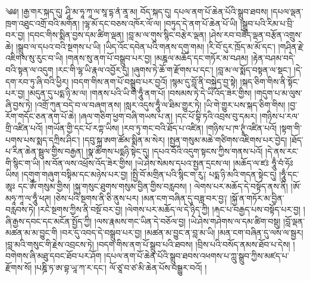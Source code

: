 \setcounter{footnote}{0} 
༄༅། །རྒྱ་གར་སྐད་དུ། ཤཱི་མ་ཧཱ་ཀཱ་ལ་སཱ་དྷ་ནཾ་ནཱ་མ། བོད་སྐད་དུ། དཔལ་ནག་པོ་ཆེན་པོའི་སྒྲུབ་ཐབས། །དཔལ་ལྡན་ཁྲག་འཐུང་འགྲོ་བའི་མགོན། །ལྷ་མོ་དང་བཅས་འཁོར་ལོ་ལ། །བཏུད་དེ་ནག་པོ་ཆེན་པོ་ཡི། །སྒྲུབ་པའི་རིམ་པ་བྲི་བར་བྱ། །དབང་གིས་སྨིན་བྱས་དམ་ཚིག་ལྡན། །བླ་མ་ལ་གུས་སྙིང་བརྩེར་ལྡན། །ཤེས་རབ་བཟོད་ལྡན་བརྩོན་འགྲུས་ཆེ། །སྒྲུབ་ལ་དཔའ་བའི་སྔགས་པ་ཡི། །ཡིད་འོང་དབེན་པའི་གནས་དགུ་གམ། །རི་བོ་དུར་ཁྲོད་མ་མོ་དང་། །གཤིན་རྗེ་འཇིགས་སུ་རུང་བ་ཡི། །གནས་སུ་ནག་པོ་བསྒྲུབ་པར་བྱ། །མཎྜལ་མཆོད་དང་གཏོར་མ་བཤམ། །རྟེན་བཤམ་བདེ་བའི་སྟན་ལ་འདུག །རང་གི་ལྷ་ཡི་རྣལ་འབྱོར་དུ། །ཞུགས་ཏེ་ཆོ་ག་རྫོགས་པ་དང་། །བླ་མ་ལ་སྨོད་བསྟན་ལ་སྡང་། །དེ་དག་རབ་ཏུ་ཞི་བའི་ཕྱིར། །བདག་གིས་ནག་པོ་བསྒྲུབ་པར་བྱའོ། །སྙམ་དུ་བློ་ནི་བསྐྱེད་བྱ་སྟེ། །སྐད་ཅིག་གིས་ནི་སྟོང་པར་བྱ། །མདུན་དུ་པདྨ་ཉི་མ་ལ། །གནས་པའི་ཡི་གེ་ཧཱུྃ་ནག་པོ། །བསམས་ཏེ་དེ་ཡི་འོད་ཟེར་གྱིས། །གདུག་པ་མ་ལུས་ཞི་བྱས་ཏེ། །འགྲོ་ཀུན་བདེ་བ་ལ་བཞག་ནས། །སླར་འདུས་ཧཱུྃ་ལ་ཐིམ་གྱུར་ཏེ། །ཡི་གེ་གྱུར་པས་སྐད་ཅིག་གིས། །བྱ་རོག་གདོང་ཅན་ནག་པོ་ཆེ། །ཞལ་གཅིག་ཕྱག་བཞི་གཡས་པ་ན། །དང་པོ་བྷི་ཏའི་འབྲས་བུ་དམར། །གཉིས་པ་རལ་གྲི་འཛིན་པའོ། །གཡོན་གྱི་དང་པོ་རཀྟ་ཡིས། །རབ་ཏུ་གང་བའི་ཐོད་པ་འཛིན། །གཉིས་པ་ཁ་ཊྭཱཾ་འཛིན་པའོ། །སྟག་གི་པགས་པས་སྨད་དཀྲིས་ཤིང་། །དབུ་སྐྲ་ཨག་ཚོམ་སྨིན་མ་སེར། །སྤྱན་གསུམ་མཆེ་གཙིགས་འཇིགས་པར་བྱེད། །ཐོད་པ་རིན་ཆེན་སྦྲུལ་གྱིས་བརྒྱན། །སྣ་ཚོགས་པདྨཉི་སྟེང་དུ། །དཔའ་བོའི་འདུག་སྟངས་ཀྱིས་གནས་པའོ། །དེ་ནས་རང་གི་སྙིང་ག་ཡི། །ས་བོན་ལས་འཕྲོས་འོད་ཟེར་གྱིས། །ཡེ་ཤེས་སེམས་དཔའ་སྤྱན་དྲངས་ལ། །མཆོད་ལ་ཛཿ ཧཱུྃ་བཾ་ཧོཿ ཡིས། །དགུག་གཞུག་བསྟིམ་དང་མཉེས་པར་བྱ། །སྤྱི་བོ་མགྲིན་པའི་སྙིང་ག་རུ༑ པདྨ་ཉི་མའི་གདན་སྟེང་དུ། །ཧཱུྃ་དང་ཨཱཿ དང་ཨོཾ་གསུམ་གྱིས། །སྐུ་གསུང་ཐུགས་གསུམ་བྱིན་གྱིས་བརླབས། །
ལེགས་པར་མཆོད་དེ་བསྟོད་ནས་ནི། །ཨོ་མཧཱ་ཀཱ་ལ་ཧཱུྃ་ཕཊ྄། །ཅེས་པའི་སྔགས་ནི་ཅི་ནུས་པར། །མན་ངག་བཞིན་དུ་བཟླ་བར་བྱ༑ །སྐྱོ་ན་གཏོར་མ་བྱིན་བརླབས་ཏེ། །རང་སྔགས་ཀྱིས་ནི་བསྔོ་བར་བྱ། །ལེགས་པར་མཆོད་ལ་དེ་ཉིད་ཀྱི། །རྐང་པ་བརྒྱད་པས་བསྟོད་པར་བྱ། །ཞི་རྒྱས་དབང་དང་མངོན་སྤྱོད་ཀྱི། །ལས་རྣམས་གང་ཡིན་དེ་བཅོལ་བྱ། །ཡེ་ཤེས་གཤེགས་ལ་དམ་ཚིག་བསྡུ། །བློ་ལྡན་མཚན་མ་མ་བྱུང་གི །བར་དུ་འབད་དེ་བསྒྲུབ་པར་བྱ། །མཚན་མ་བྱུང་ན་བླ་མ་ཡི། །མན་ངག་བཞིན་དུ་ལས་ལ་སྦྱར། །བླ་མའི་གསུང་གི་རྗེས་འབྲངས་ཏེ། །བདག་གིས་ནག་པོ་སྒྲུབ་པའི་ཐབས། །བྲིས་པའི་བསོད་ནམས་ཐོབ་པ་དེས། །བགེགས་ཞི་མཐུ་དབང་ཐོབ་པར་ཤོག །དཔལ་ནག་པོ་ཆེན་པོའི་སྒྲུབ་ཐབས་འཕགས་པ་ཀླུ་སྒྲུབ་ཀྱིས་མཛད་པ་རྫོགས་སོ། །པཎྜི་ཏ་ཨ་བྷ་ཡཱ་ཀ་ར་དང་། ལོ་ཙཱ་བ་ཙ་མི་ཆེན་པོས་བསྒྱུར་བའོ། །